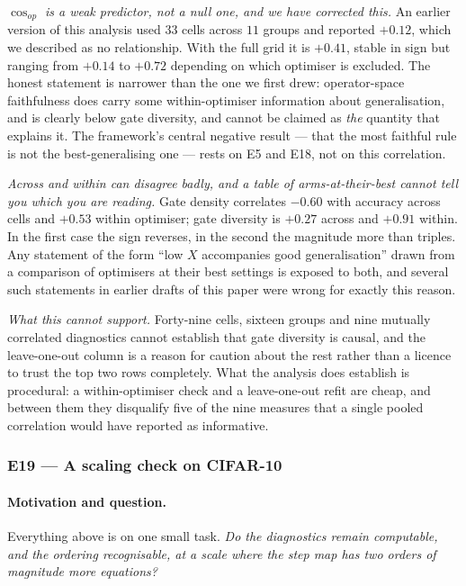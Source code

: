 \documentclass{article} %
\theoremstyle{plain}
\theoremstyle{definition}
\theoremstyle{remark}
\begin{document}
\emph{$\cos_{op}$ is a weak predictor, not a null one, and we have corrected this.} An earlier
version of this analysis used $33$ cells across $11$ groups and reported $+0.12$, which we
described as no relationship. With the full grid it is $+0.41$, stable in sign but ranging from
$+0.14$ to $+0.72$ depending on which optimiser is excluded. The honest statement is narrower than
the one we first drew: operator-space faithfulness does carry some within-optimiser information
about generalisation, and is clearly below gate diversity, and cannot be claimed as \emph{the}
quantity that explains it. The framework's central negative result --- that the most faithful rule
is not the best-generalising one --- rests on E5 and E18, not on this correlation.

\emph{Across and within can disagree badly, and a table of arms-at-their-best cannot tell you
which you are reading.} Gate density correlates $-0.60$ with accuracy across cells and $+0.53$
within optimiser; gate diversity is $+0.27$ across and $+0.91$ within. In the first case the sign
reverses, in the second the magnitude more than triples. Any statement of the form ``low $X$
accompanies good generalisation'' drawn from a comparison of optimisers at their best settings is
exposed to both, and several such statements in earlier drafts of this paper were wrong for
exactly this reason.

\emph{What this cannot support.} Forty-nine cells, sixteen groups and nine mutually correlated
diagnostics cannot establish that gate diversity is causal, and the leave-one-out column is a
reason for caution about the rest rather than a licence to trust the top two rows completely. What
the analysis does establish is procedural: a within-optimiser check and a leave-one-out refit are
cheap, and between them they disqualify five of the nine measures that a single pooled correlation
would have reported as informative.

\subsubsection{E19 --- A scaling check on CIFAR-10}
\label{sec:e19}

\paragraph{Motivation and question.}
Everything above is on one small task. \emph{Do the diagnostics remain computable, and the ordering
recognisable, at a scale where the step map has two orders of magnitude more equations?}
\end{document}
